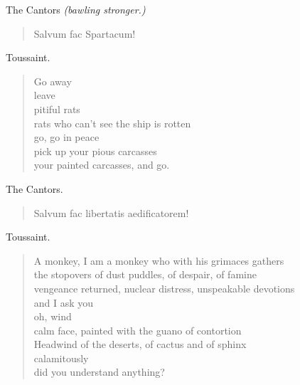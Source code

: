 \documentclass[letterpaper,article,12pt,oneside,notitlepage]{memoir}
\begin{document}
\begin{center}The Cantors \textit{(bawling stronger.)}\end{center}

\begin{verse}
Salvum fac Spartacum! \\
\end{verse}

\begin{center}Toussaint.\end{center}

\begin{verse}
Go away \\
leave \\
pitiful rats \\
rats who can't see the ship is rotten \\
go, go in peace \\
pick up your pious carcasses \\
your painted carcasses, and go. \\
\end{verse}

\begin{center}The Cantors.\end{center}

\begin{verse}
Salvum fac libertatis aedificatorem! \\
\end{verse}

\begin{center}Toussaint.\end{center}

\begin{verse}
A monkey, I am a monkey who with his grimaces gathers \\
the stopovers of dust puddles, of despair, of famine \\
vengeance returned, nuclear distress, unspeakable devotions \\
and I ask you \\
oh, wind \\
calm face, painted with the guano of contortion \\
Headwind of the deserts, of cactus and of sphinx \\
calamitously \\
did you understand anything? \\
\end{verse}

\clearpage
\end{document}
